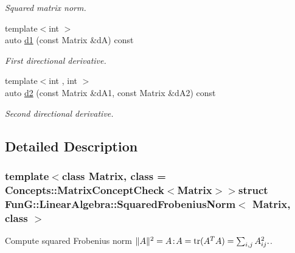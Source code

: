 \begin{DoxyCompactItemize}
\begin{DoxyCompactList}\small\item\em Squared matrix norm. \end{DoxyCompactList}\item 
\hypertarget{structFunG_1_1LinearAlgebra_1_1SquaredFrobeniusNorm_acdc2559a789f9efbeef00b32a1d5b0c2}{{\footnotesize template$<$int $>$ }\\auto \hyperlink{structFunG_1_1LinearAlgebra_1_1SquaredFrobeniusNorm_acdc2559a789f9efbeef00b32a1d5b0c2}{d1} (const Matrix \&d\-A) const }\label{structFunG_1_1LinearAlgebra_1_1SquaredFrobeniusNorm_acdc2559a789f9efbeef00b32a1d5b0c2}

\begin{DoxyCompactList}\small\item\em First directional derivative. \end{DoxyCompactList}\item 
\hypertarget{structFunG_1_1LinearAlgebra_1_1SquaredFrobeniusNorm_a188f4cb4b23939479af2f6eb4cb4045f}{{\footnotesize template$<$int , int $>$ }\\auto \hyperlink{structFunG_1_1LinearAlgebra_1_1SquaredFrobeniusNorm_a188f4cb4b23939479af2f6eb4cb4045f}{d2} (const Matrix \&d\-A1, const Matrix \&d\-A2) const }\label{structFunG_1_1LinearAlgebra_1_1SquaredFrobeniusNorm_a188f4cb4b23939479af2f6eb4cb4045f}

\begin{DoxyCompactList}\small\item\em Second directional derivative. \end{DoxyCompactList}\end{DoxyCompactItemize}


\subsection{Detailed Description}
\subsubsection*{template$<$class Matrix, class = Concepts\-::\-Matrix\-Concept\-Check$<$\-Matrix$>$$>$struct Fun\-G\-::\-Linear\-Algebra\-::\-Squared\-Frobenius\-Norm$<$ Matrix, class $>$}

Compute squared Frobenius norm $ \|A\|^2 = A\negthinspace : \negthinspace A = \mathrm{tr}(A^TA) = \sum_{i,j} A_{ij}^2. $. 

